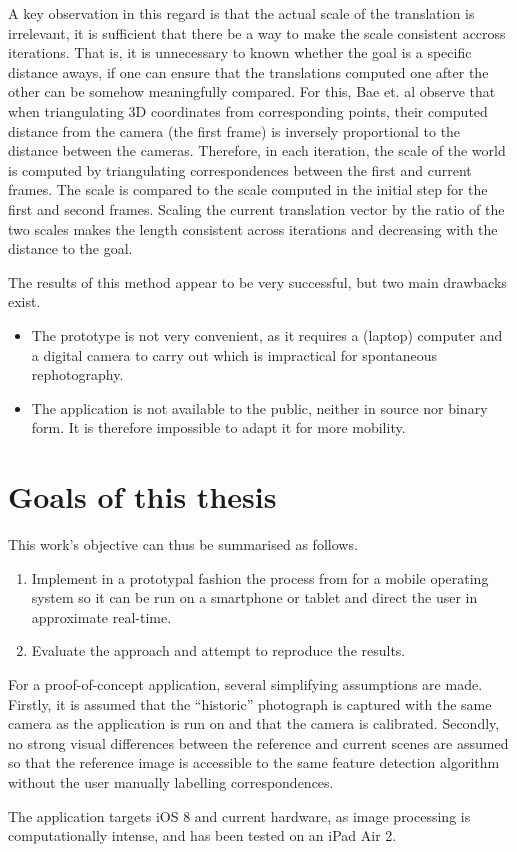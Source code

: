 A key observation in this regard is that the actual scale of the translation is
irrelevant, it is sufficient that there be a way to make the scale consistent
accross iterations. That is, it is unnecessary to known whether the goal is a
specific distance aways, if one can ensure that the translations computed one
after the other can be somehow meaningfully compared. For this, Bae et. al
observe that when triangulating 3D coordinates from corresponding points, their
computed distance from the camera (the first frame) is inversely proportional
to the distance between the cameras. Therefore, in each iteration, the scale of
the world is computed by triangulating correspondences between the first and
current frames. The scale is compared to the scale computed in the initial step
for the first and second frames. Scaling the current translation vector by the
ratio of the two scales makes the length consistent across iterations and
decreasing with the distance to the goal.

The results of this method appear to be very successful, but two main drawbacks
exist.
\begin{itemize}
   \item The prototype is not very convenient, as it requires a (laptop)
      computer and a digital camera to carry out which is impractical for
      spontaneous rephotography.
   \item The application is not available to the public, neither in source nor
      binary form. It is therefore impossible to adapt it for more mobility.
\end{itemize}

\section{Goals of this thesis}

This work's objective can thus be summarised as follows.
\begin{enumerate}
   \item Implement in a prototypal fashion the process from \citep{bae2010} for
      a mobile operating system so it can be run on a smartphone or tablet and
      direct the user in approximate real-time.
   \item Evaluate the approach and attempt to reproduce the results.
\end{enumerate}

For a proof-of-concept application, several simplifying assumptions are made.
Firstly, it is assumed that the ``historic'' photograph is captured with the
same camera as the application is run on and that the camera is calibrated.
Secondly, no strong visual differences between the reference and current scenes
are assumed so that the reference image is accessible to the same feature
detection algorithm without the user manually labelling correspondences. 

The application targets iOS 8 and current hardware, as image processing is
computationally intense, and has been tested on an iPad Air 2.
